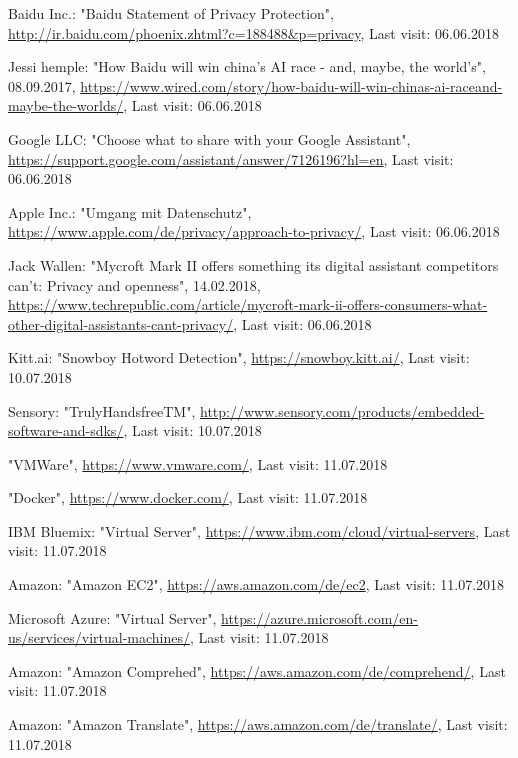 \documentclass[journal]{IEEEtran}
\begin{document}
\begin{thebibliography}{1}
Baidu Inc.: "Baidu Statement of Privacy Protection", \url{http://ir.baidu.com/phoenix.zhtml?c=188488\&p=privacy},
Last visit: 06.06.2018


Jessi hemple: "How Baidu will win china's AI race - and, maybe, the world's", 08.09.2017, \url{https://www.wired.com/story/how-baidu-will-win-chinas-ai-raceand-maybe-the-worlds/},
Last visit: 06.06.2018

Google LLC: "Choose what to share with your Google Assistant", \url{https://support.google.com/assistant/answer/7126196?hl=en},
Last visit: 06.06.2018

Apple Inc.: "Umgang mit Datenschutz", \url{https://www.apple.com/de/privacy/approach-to-privacy/},
Last visit: 06.06.2018

Jack Wallen: "Mycroft Mark II offers something its digital assistant competitors can't: Privacy and openness", 14.02.2018, \url{https://www.techrepublic.com/article/mycroft-mark-ii-offers-consumers-what-other-digital-assistants-cant-privacy/},
Last visit: 06.06.2018	
	
Kitt.ai: "Snowboy Hotword Detection",
\url{https://snowboy.kitt.ai/},
Last visit: 10.07.2018

Sensory: "TrulyHandsfreeTM",
\url{http://www.sensory.com/products/embedded-software-and-sdks/},
Last visit: 10.07.2018

"VMWare",
\url{https://www.vmware.com/},
Last visit: 11.07.2018

"Docker",
\url{https://www.docker.com/},
Last visit: 11.07.2018

IBM Bluemix: "Virtual Server",
\url{https://www.ibm.com/cloud/virtual-servers},
Last visit: 11.07.2018

Amazon: "Amazon EC2",
\url{https://aws.amazon.com/de/ec2},
Last visit: 11.07.2018

Microsoft Azure: "Virtual Server",
\url{https://azure.microsoft.com/en-us/services/virtual-machines/},
Last visit: 11.07.2018

Amazon: "Amazon Comprehed",
\url{https://aws.amazon.com/de/comprehend/},
Last visit: 11.07.2018

Amazon: "Amazon Translate",
\url{https://aws.amazon.com/de/translate/},
Last visit: 11.07.2018


\end{thebibliography}
\end{document}

